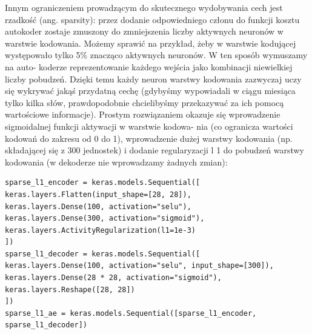 \documentclass[12pt]{mwbk}
\theoremstyle{plain}
\theoremstyle{definition}
\theoremstyle{remark}
\begin{document}
Innym ograniczeniem prowadzącym do skutecznego wydobywania cech jest rzadkość (ang. sparsity):
przez dodanie odpowiedniego członu do funkcji kosztu autokoder zostaje zmuszony do zmniejszenia
liczby aktywnych neuronów w warstwie kodowania. Możemy sprawić na przykład, żeby w warstwie
kodującej występowało tylko 5\% znacząco aktywnych neuronów. W ten sposób wymuszamy na auto-
koderze reprezentowanie każdego wejścia jako kombinacji niewielkiej liczby pobudzeń. Dzięki temu
każdy neuron warstwy kodowania zazwyczaj uczy się wykrywać jakąś przydatną cechę (gdybyśmy
wypowiadali w ciągu miesiąca tylko kilka słów, prawdopodobnie chcielibyśmy przekazywać za ich
pomocą wartościowe informacje).
Prostym rozwiązaniem okazuje się wprowadzenie sigmoidalnej funkcji aktywacji w warstwie kodowa-
nia (co ogranicza wartości kodowań do zakresu od 0 do 1), wprowadzenie dużej warstwy kodowania
(np. składającej się z 300 jednostek) i dodanie regularyzacji l 1 do pobudzeń warstwy kodowania
(w dekoderze nie wprowadzamy żadnych zmian):
\begin{verbatim}
sparse_l1_encoder = keras.models.Sequential([
keras.layers.Flatten(input_shape=[28, 28]),
keras.layers.Dense(100, activation="selu"),
keras.layers.Dense(300, activation="sigmoid"),
keras.layers.ActivityRegularization(l1=1e-3)
])
sparse_l1_decoder = keras.models.Sequential([
keras.layers.Dense(100, activation="selu", input_shape=[300]),
keras.layers.Dense(28 * 28, activation="sigmoid"),
keras.layers.Reshape([28, 28])
])
sparse_l1_ae = keras.models.Sequential([sparse_l1_encoder,
sparse_l1_decoder])
\end{verbatim}
\end{document}
